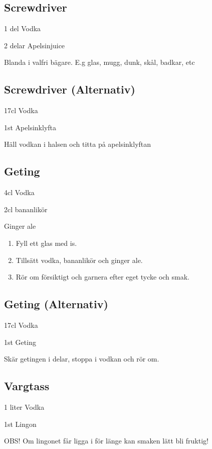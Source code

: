 \subsection{\textbf{Screwdriver}}

1 del Vodka

2 delar Apelsinjuice

Blanda i valfri bägare. E.g glas, mugg, dunk, skål, badkar, etc

\subsection{\textbf{Screwdriver (Alternativ)}}

17cl Vodka

1st Apelsinklyfta

Häll vodkan i halsen och titta på apelsinklyftan

\subsection{\textbf{Geting}}

4cl Vodka

2cl bananlikör

Ginger ale

\begin{enumerate}
    \item Fyll ett glas med is.
    \item Tillsätt vodka, bananlikör och ginger ale.
    \item Rör om försiktigt och garnera efter eget tycke och smak.
\end{enumerate}

\subsection{\textbf{Geting (Alternativ)}}

17cl Vodka

1st Geting

Skär getingen i delar, stoppa i vodkan och rör om.

\subsection{\textbf{Vargtass}}

1 liter Vodka

1st Lingon

OBS! Om lingonet får ligga i för länge kan smaken lätt bli fruktig!

